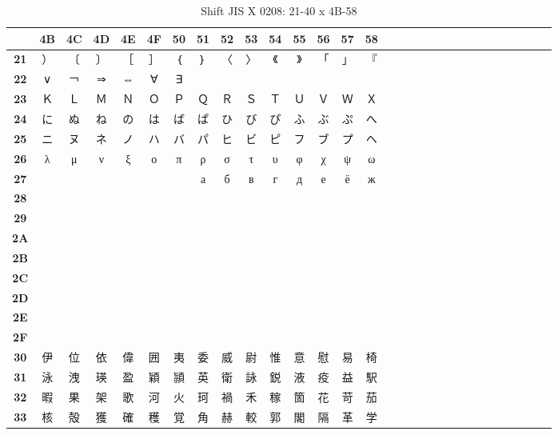 \begin{table}[H]
\centering
\caption{Shift JIS X 0208: 21-40 x 4B-58}
\begin{tabular}{|Sc|Sc|Sc|Sc|Sc|Sc|Sc|Sc|Sc|Sc|Sc|Sc|Sc|Sc|Sc|}
\hline
 & \textbf{4B} & \textbf{4C} & \textbf{4D} & \textbf{4E} & \textbf{4F} & \textbf{50} & \textbf{51} & \textbf{52} & \textbf{53} & \textbf{54} & \textbf{55} & \textbf{56} & \textbf{57} & \textbf{58} \\ \hline
\textbf{21} & ） & 〔 & 〕 & ［ & ］ & ｛ & ｝ & 〈 & 〉 & 《 & 》 & 「 & 」 & 『 \\ \hline
\textbf{22} & ∨ & ￢ & ⇒ & ⇔ & ∀ & ∃ &   &   &   &   &   &   &   &   \\ \hline
\textbf{23} & Ｋ & Ｌ & Ｍ & Ｎ & Ｏ & Ｐ & Ｑ & Ｒ & Ｓ & Ｔ & Ｕ & Ｖ & Ｗ & Ｘ \\ \hline
\textbf{24} & に & ぬ & ね & の & は & ば & ぱ & ひ & び & ぴ & ふ & ぶ & ぷ & へ \\ \hline
\textbf{25} & ニ & ヌ & ネ & ノ & ハ & バ & パ & ヒ & ビ & ピ & フ & ブ & プ & ヘ \\ \hline
\textbf{26} & λ & μ & ν & ξ & ο & π & ρ & σ & τ & υ & φ & χ & ψ & ω \\ \hline
\textbf{27} &   &   &   &   &   &   & а & б & в & г & д & е & ё & ж \\ \hline
\textbf{28} &  &  &  &  &  &  &  &  &  &  &  &  &  &  \\ \hline
\textbf{29} &  &  &  &  &  &  &  &  &  &  &  &  &  &  \\ \hline
\textbf{2A} &  &  &  &  &  &  &  &  &  &  &  &  &  &  \\ \hline
\textbf{2B} &  &  &  &  &  &  &  &  &  &  &  &  &  &  \\ \hline
\textbf{2C} &  &  &  &  &  &  &  &  &  &  &  &  &  &  \\ \hline
\textbf{2D} &  &  &  &  &  &  &  &  &  &  &  &  &  &  \\ \hline
\textbf{2E} &  &  &  &  &  &  &  &  &  &  &  &  &  &  \\ \hline
\textbf{2F} &  &  &  &  &  &  &  &  &  &  &  &  &  &  \\ \hline
\textbf{30} & 伊 & 位 & 依 & 偉 & 囲 & 夷 & 委 & 威 & 尉 & 惟 & 意 & 慰 & 易 & 椅 \\ \hline
\textbf{31} & 泳 & 洩 & 瑛 & 盈 & 穎 & 頴 & 英 & 衛 & 詠 & 鋭 & 液 & 疫 & 益 & 駅 \\ \hline
\textbf{32} & 暇 & 果 & 架 & 歌 & 河 & 火 & 珂 & 禍 & 禾 & 稼 & 箇 & 花 & 苛 & 茄 \\ \hline
\textbf{33} & 核 & 殻 & 獲 & 確 & 穫 & 覚 & 角 & 赫 & 較 & 郭 & 閣 & 隔 & 革 & 学 \\ \hline

\end{tabular}
\end{table}
